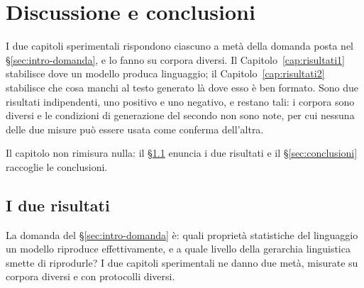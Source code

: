 %

\chapter{Discussione e conclusioni}
\label{cap:discussione}

I due capitoli sperimentali rispondono ciascuno a metà della domanda posta nel
§\ref{sec:intro-domanda}, e lo fanno su corpora diversi. Il
Capitolo~\ref{cap:risultati1} stabilisce dove un modello produca linguaggio; il
Capitolo~\ref{cap:risultati2} stabilisce che cosa manchi al testo generato là
dove esso è ben formato. Sono due risultati indipendenti, uno positivo e uno negativo, e restano tali:
i corpora sono diversi e le condizioni di generazione del secondo non sono
note, per cui nessuna delle due misure può essere usata come conferma
dell'altra.

Il capitolo non rimisura nulla: il §\ref{sec:risposta} enuncia i due risultati
e il §\ref{sec:conclusioni} raccoglie le conclusioni.


\section{I due risultati}
\label{sec:risposta}
\label{sec:convergenza-cosa}
\label{sec:persistenza}

La domanda del §\ref{sec:intro-domanda} è: quali proprietà statistiche del
linguaggio un modello riproduce effettivamente, e a quale livello della
gerarchia linguistica smette di riprodurle? I due capitoli sperimentali ne
danno due metà, misurate su corpora diversi e con protocolli diversi.

